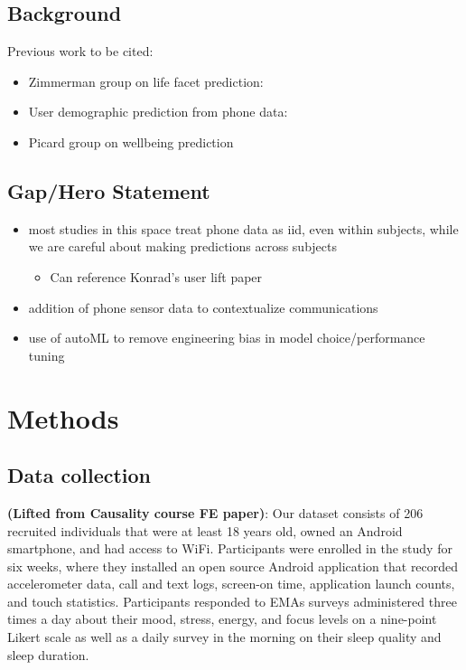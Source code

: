 \documentclass{article}
\begin{document}
\subsection{Background}

Previous work to be cited:
\begin{itemize}
    \item Zimmerman group on life facet prediction:~\cite{min2013mining, wiese2015you}
    \item User demographic prediction from phone data:~\cite{zhong2013user}
    \item Picard group on wellbeing prediction~\cite{jaques2015predicting}
\end{itemize}

\subsection{Gap/Hero Statement}

\begin{itemize}
    \item most studies in this space treat phone data as iid, even within subjects, while we are careful about making predictions across subjects 
    \begin{itemize}
        \item Can reference Konrad's user lift paper~\cite{demasi2017meaningless}
    \end{itemize}
    \item addition of phone sensor data to contextualize communications
    \item use of autoML to remove engineering bias in model choice/performance tuning~\cite{feurer2015efficient}

\end{itemize}

\section{Methods}

\subsection{Data collection}

\textbf{(Lifted from Causality course FE paper)}: Our dataset consists of 206 recruited individuals that were at least 18 years old, owned an Android smartphone, and had access to WiFi. Participants were enrolled in the study for six weeks, where they installed an open source Android application that recorded accelerometer data, call and text logs, screen-on time, application launch counts, and touch statistics. Participants responded to EMAs surveys administered three times a day about their mood, stress, energy, and focus levels on a nine-point Likert scale as well as a daily survey in the morning on their sleep quality and sleep duration.
\end{document}
